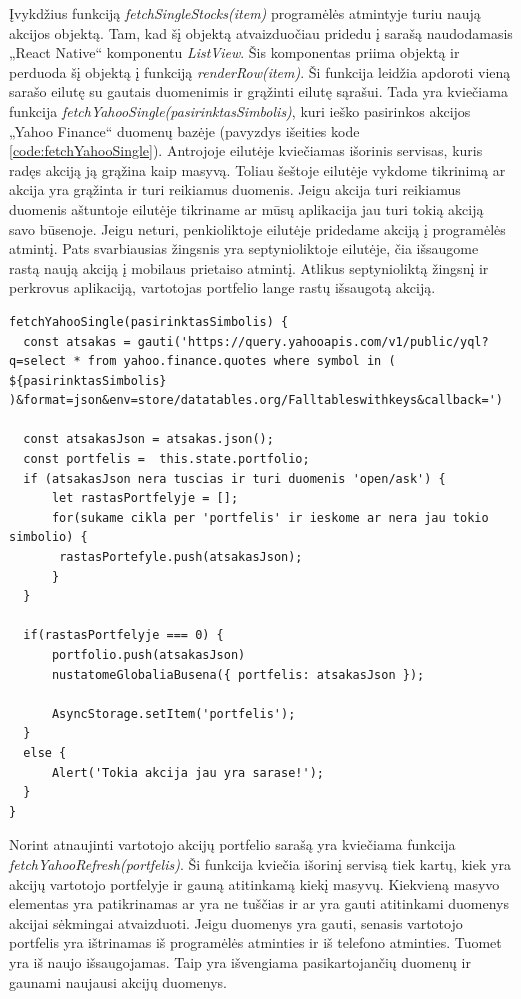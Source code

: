 \documentclass[a4paper,12pt,fleqn]{article}
\begin{document}
Įvykdžius funkciją \textit{fetchSingleStocks(item)} programėlės atmintyje turiu naują akcijos objektą. Tam, kad šį objektą atvaizduočiau pridedu į sarašą naudodamasis „React Native“ komponentu \textit{ListView}. Šis komponentas priima objektą ir perduoda šį objektą į funkciją \textit{renderRow(item)}. Ši funkcija leidžia apdoroti vieną sarašo eilutę su gautais duomenimis ir grąžinti eilutę sąrašui. Tada yra kviečiama funkcija \textit{fetchYahooSingle(pasirinktasSimbolis)}, kuri ieško pasirinkos akcijos „Yahoo Finance“ duomenų bazėje (pavyzdys išeities kode \ref{code:fetchYahooSingle}). Antrojoje eilutėje kviečiamas išorinis servisas, kuris radęs akciją ją grąžina kaip masyvą. Toliau šeštoje eilutėje vykdome tikrinimą ar akcija yra grąžinta ir turi reikiamus duomenis. Jeigu akcija turi reikiamus duomenis aštuntoje eilutėje tikriname ar mūsų aplikacija jau turi tokią akciją savo būsenoje. Jeigu neturi, penkioliktoje eilutėje pridedame akciją į programėlės atmintį. Pats svarbiausias žingsnis yra septynioliktoje eilutėje, čia išsaugome rastą naują akciją į mobilaus prietaiso atmintį. Atlikus septynioliktą žingsnį ir perkrovus aplikaciją, vartotojas portfelio lange rastų išsaugotą akciją.

\newpage
\begin{lstlisting}[caption={Funkcijos fetchYahooSingle() pseudokodas.}, label={code:fetchYahooSingle}]
fetchYahooSingle(pasirinktasSimbolis) {
  const atsakas = gauti('https://query.yahooapis.com/v1/public/yql?q=select * from yahoo.finance.quotes where symbol in ( ${pasirinktasSimbolis} )&format=json&env=store/datatables.org/Falltableswithkeys&callback=')
  
  const atsakasJson = atsakas.json();
  const portfelis =  this.state.portfolio;
  if (atsakasJson nera tuscias ir turi duomenis 'open/ask') {
	  let rastasPortfelyje = [];
	  for(sukame cikla per 'portfelis' ir ieskome ar nera jau tokio simbolio) {
	   rastasPortefyle.push(atsakasJson);
	  }
  }
  
  if(rastasPortfelyje === 0) {
	  portfolio.push(atsakasJson)
	  nustatomeGlobaliaBusena({ portfelis: atsakasJson });
	  
	  AsyncStorage.setItem('portfelis');
  } 
  else {
	  Alert('Tokia akcija jau yra sarase!');
  }
}
\end{lstlisting}

Norint atnaujinti vartotojo akcijų portfelio sarašą yra kviečiama funkcija \textit{fetchYahooRefresh(portfelis)}. Ši funkcija kviečia išorinį servisą tiek kartų, kiek yra akcijų vartotojo portfelyje ir gauną atitinkamą kiekį masyvų. Kiekvieną masyvo elementas yra patikrinamas ar yra ne tuščias ir ar yra gauti atitinkami duomenys akcijai sėkmingai atvaizduoti. Jeigu duomenys yra gauti, senasis vartotojo portfelis yra ištrinamas iš programėlės atminties ir iš telefono atminties. Tuomet yra iš naujo išsaugojamas. Taip yra išvengiama pasikartojančių duomenų ir gaunami naujausi akcijų duomenys.
\end{document}

